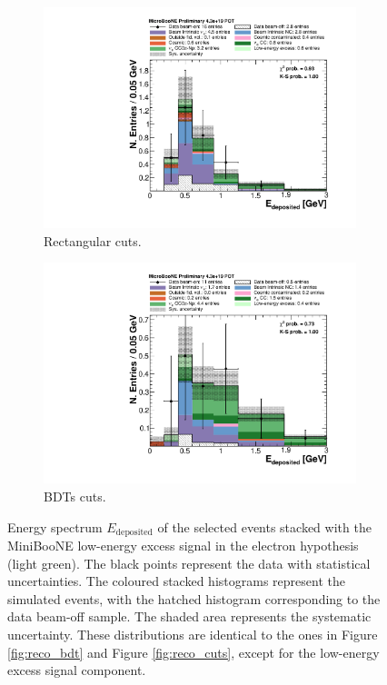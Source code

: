 \begin{figure}[htbp]
  \begin{center}
    \begin{subfigure}{0.48\textwidth}
      \includegraphics[width=\linewidth]{figures/cuts_lee.pdf}
      \caption{Rectangular cuts.} 
    \end{subfigure}\hfill
    \begin{subfigure}{0.48\textwidth}
      \includegraphics[width=\linewidth]{figures/bdt_lee.pdf}
      \caption{BDTs cuts.}  
    \end{subfigure}
    \caption{Energy spectrum $E_{\mathrm{deposited}}$ of the selected events stacked with the MiniBooNE low-energy excess signal in the electron hypothesis (light green). The black points represent the data with statistical uncertainties. The coloured stacked histograms represent the simulated events, with the hatched histogram corresponding to the data beam-off sample. The shaded area represents the systematic uncertainty. These distributions are identical to the ones in Figure \ref{fig:reco_bdt} and Figure \ref{fig:reco_cuts}, except for the low-energy excess signal component.} \label{fig:lee_after}
	\end{center}
\end{figure}


